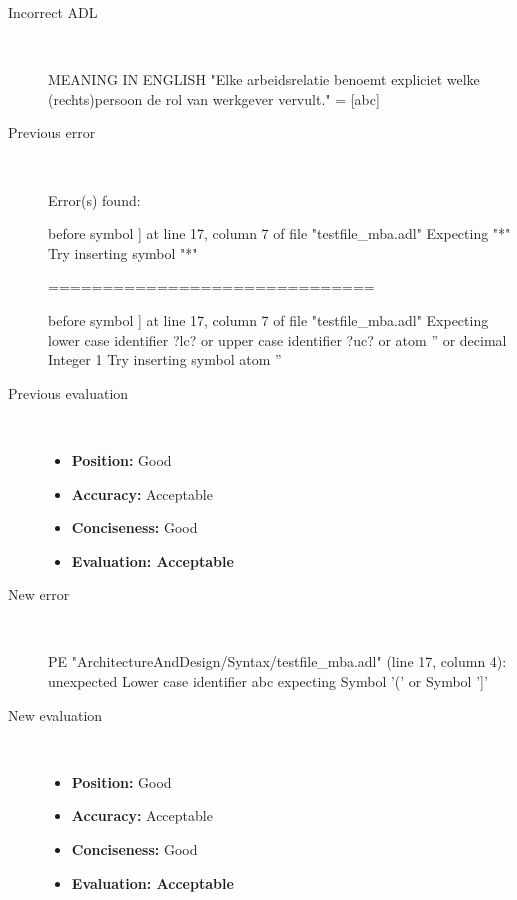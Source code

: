 \begin{description}
  \item[Incorrect ADL]~\\
\begin{adl}
MEANING IN ENGLISH "Elke arbeidsrelatie benoemt expliciet welke (rechts)persoon de rol van werkgever vervult."
= [abc]\end{adl}
  \item[Previous error]~\\
\begin{haskell}
Error(s) found:

before symbol ] at line 17, column 7 of file "testfile_mba.adl"
Expecting "*"
Try inserting symbol "*"

==============================

before symbol ] at line 17, column 7 of file "testfile_mba.adl"
Expecting lower case identifier ?lc? or upper case identifier ?uc? or atom '' or
 decimal Integer 1
Try inserting symbol atom ''
\end{haskell}
  \item[Previous evaluation]~\\
    \begin{itemize}
    \item \textbf{Position:} Good
    \item \textbf{Accuracy:} Acceptable
    \item \textbf{Conciseness:} Good
    \item \textbf{Evaluation: Acceptable}
    \end{itemize}
  \item[New error]~\\
\begin{haskell}
PE "ArchitectureAndDesign/Syntax/testfile_mba.adl" (line 17, column 4):
unexpected Lower case identifier abc
expecting Symbol '(' or Symbol ']'\end{haskell}
  \item[New evaluation]~\\
    \begin{itemize}
    \item \textbf{Position:} Good
    \item \textbf{Accuracy:} Acceptable
    \item \textbf{Conciseness:} Good
    \item \textbf{Evaluation: Acceptable}
    \end{itemize}
  \end{description}

